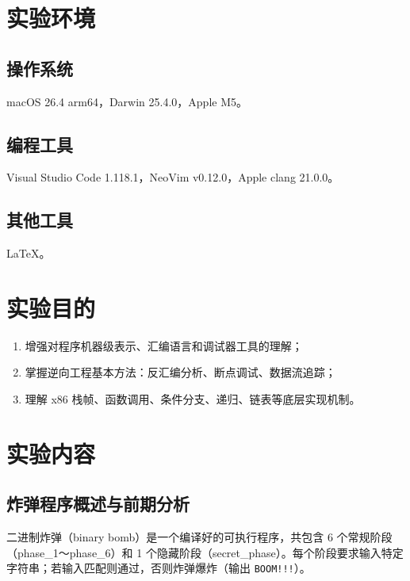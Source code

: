 \documentclass[12pt, a4paper]{academics}
\begin{document}
\makeacademicscover

\section{实验环境}

\subsection{操作系统}

macOS 26.4 arm64，Darwin 25.4.0，Apple M5。

\subsection{编程工具}

Visual Studio Code 1.118.1，NeoVim v0.12.0，Apple clang 21.0.0。

\subsection{其他工具}

\LaTeX{}。

\section{实验目的}

\begin{enumerate}
    \item 增强对程序机器级表示、汇编语言和调试器工具的理解；
    \item 掌握逆向工程基本方法：反汇编分析、断点调试、数据流追踪；
    \item 理解 x86 栈帧、函数调用、条件分支、递归、链表等底层实现机制。
\end{enumerate}

\section{实验内容}

\subsection{炸弹程序概述与前期分析}

二进制炸弹（binary bomb）是一个编译好的可执行程序，共包含 6 个常规阶段（phase\_1～phase\_6）和 1 个隐藏阶段（secret\_phase）。每个阶段要求输入特定字符串；若输入匹配则通过，否则炸弹爆炸（输出 \texttt{BOOM!!!}）。
\end{document}
